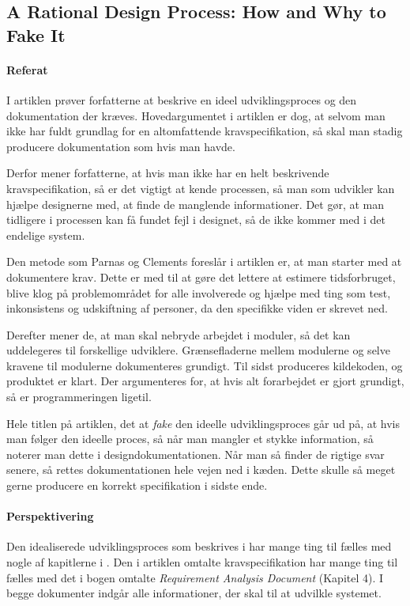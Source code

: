 \documentclass[12pt]{article}
\begin{document}
\subsection{A Rational Design Process: How and Why to Fake It}
\label{sub:a_rational_design_process}
\paragraph{Referat}
I artiklen \cite{parnas1986rational} prøver forfatterne at beskrive en ideel udviklingsproces og den dokumentation der kræves. Hovedargumentet i artiklen er dog, at selvom man ikke har fuldt grundlag for en altomfattende kravspecifikation, så skal man stadig producere dokumentation som hvis man havde.

Derfor mener forfatterne, at hvis man ikke har en helt beskrivende kravspecifikation, så er det vigtigt at kende processen, så man som udvikler kan hjælpe designerne med, at finde de manglende informationer. Det gør, at man tidligere i processen kan få fundet fejl i designet, så de ikke kommer med i det endelige system.

Den metode som Parnas og Clements foreslår i artiklen er, at man starter med at dokumentere krav. Dette er med til at gøre det lettere at estimere tidsforbruget, blive klog på problemområdet for alle involverede og hjælpe med ting som test, inkonsistens og udskiftning af personer, da den specifikke viden er skrevet ned.

Derefter mener de, at man skal nebryde arbejdet i moduler, så det kan uddelegeres til forskellige udviklere. Grænsefladerne mellem modulerne og selve kravene til modulerne dokumenteres grundigt. Til sidst produceres kildekoden, og produktet er klart. Der argumenteres for, at hvis alt forarbejdet er gjort grundigt, så er programmeringen ligetil.

Hele titlen på artiklen, det at \emph{fake} den ideelle udviklingsproces går ud på, at hvis man følger den ideelle proces, så når man mangler et stykke information, så noterer man dette i designdokumentationen. Når man så finder de rigtige svar senere, så rettes dokumentationen hele vejen ned i kæden. Dette skulle så meget gerne producere en korrekt specifikation i sidste ende.

\paragraph{Perspektivering}
Den idealiserede udviklingsproces som beskrives i \cite{parnas1986rational} har mange ting til fælles med nogle af kapitlerne i \cite{OOSE}. Den i artiklen omtalte kravspecifikation har mange ting til fælles med det i bogen omtalte \emph{Requirement Analysis Document} (Kapitel 4). I begge dokumenter indgår alle informationer, der skal til at udvilkle systemet.
\end{document}
